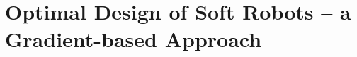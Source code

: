 \chapter[Design Optimization]{Optimal Design of Soft Robots -- a Gradient-based Approach}
\label{chap: chapter 1}


%

%

%
